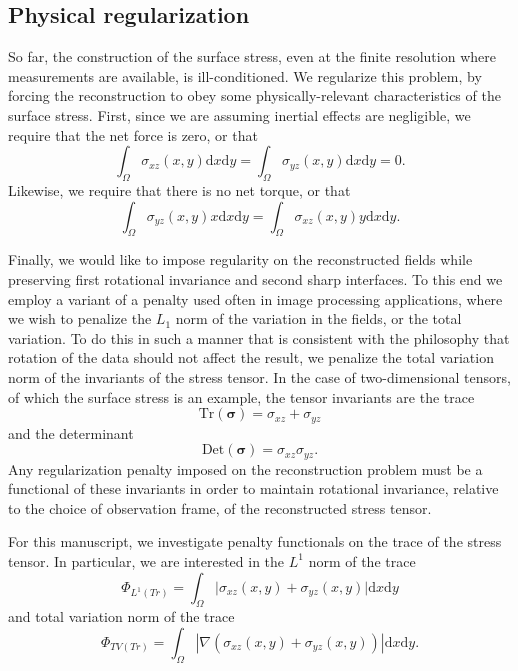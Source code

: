 \documentclass[aps,prl,reprint,twocolumn,groupedaddress,showpacs]{revtex4-1}
\newcommand{\bsigma}{{\boldsymbol\sigma}}
\def\dd{\mbox{d}}
\begin{document}
\subsection{Physical regularization}

So far, the construction of the surface stress, even at the finite
resolution where measurements are available, is ill-conditioned. We 
regularize this problem, by forcing the reconstruction to obey some physically-relevant
characteristics of the surface stress. First, since we are assuming inertial
effects are negligible, we require that the net force is zero, or that
\begin{equation}
\int_\Omega\sigma_{xz}(x,y)\dd x \dd y= \int_\Omega\sigma_{yz}(x,y)\dd x \dd y = 0 .
\end{equation}
Likewise, we require that there is no net torque, or that
\begin{equation}
\int_\Omega\sigma_{yz}(x,y)x \dd x \dd y  = \int_\Omega\sigma_{xz}(x,y)y \dd x \dd y .
\end{equation}
 
 Finally, we would like to impose regularity on the reconstructed fields while preserving first
 rotational invariance and second sharp interfaces. To this end we employ a variant of a penalty
 used often in image processing applications, where we wish to penalize the $L_1$ norm of the
 variation in the fields, or the total variation. To do this in such a manner that is consistent with
the philosophy that rotation of the data should not affect the result, we penalize the total variation
norm of the invariants of the stress tensor. In the case of two-dimensional tensors, of which the surface stress
is an example, the tensor invariants are the trace
\begin{equation}
\textrm{Tr}(\bsigma) = \sigma_{xz} + \sigma_{yz}
\end{equation}
and the determinant
\begin{equation}
\textrm{Det}(\bsigma) = \sigma_{xz} \sigma_{yz}.
\end{equation}
Any regularization penalty imposed on the reconstruction problem must be a functional
of these invariants in order to maintain rotational invariance, relative to the choice of observation frame,
 of the reconstructed stress tensor.
 
For this manuscript, we  investigate penalty functionals on the trace of the stress tensor. In particular, we are interested in the $L^1$ norm of the trace
\begin{equation}
\Phi_{L^1(Tr)} = \int_\Omega \vert \sigma_{xz}(x,y) + \sigma_{yz}(x,y)  \vert \dd x\dd y
\label{eq:PhiL1Tr}
\end{equation}
and total variation norm of the trace
%
\begin{equation}
\Phi_{TV(Tr)} =  \int_\Omega | \nabla(\sigma_{xz}(x,y) + \sigma_{yz}(x,y) ) | \dd x\dd y.
\label{eq:PhiTVTr}
\end{equation}
\end{document}
